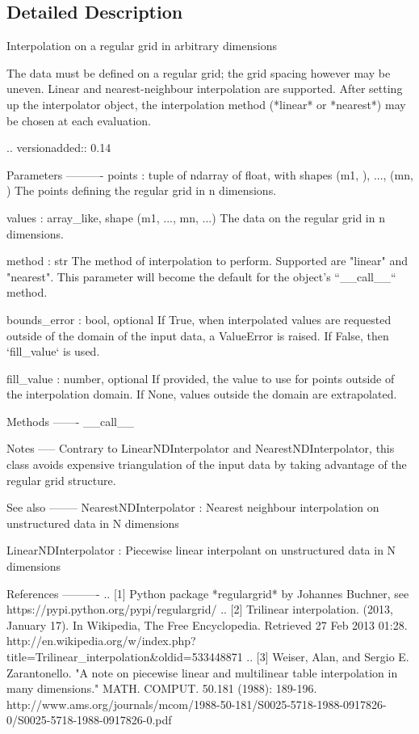 \subsection{Detailed Description}
\begin{DoxyVerb}Interpolation on a regular grid in arbitrary dimensions

The data must be defined on a regular grid; the grid spacing however may be
uneven.  Linear and nearest-neighbour interpolation are supported. After
setting up the interpolator object, the interpolation method (*linear* or
*nearest*) may be chosen at each evaluation.

.. versionadded:: 0.14

Parameters
----------
points : tuple of ndarray of float, with shapes (m1, ), ..., (mn, )
    The points defining the regular grid in n dimensions.

values : array_like, shape (m1, ..., mn, ...)
    The data on the regular grid in n dimensions.

method : str
    The method of interpolation to perform. Supported are "linear" and
    "nearest". This parameter will become the default for the object's
    ``__call__`` method.

bounds_error : bool, optional
    If True, when interpolated values are requested outside of the
    domain of the input data, a ValueError is raised.
    If False, then `fill_value` is used.

fill_value : number, optional
    If provided, the value to use for points outside of the
    interpolation domain. If None, values outside
    the domain are extrapolated.

Methods
-------
__call__

Notes
-----
Contrary to LinearNDInterpolator and NearestNDInterpolator, this class
avoids expensive triangulation of the input data by taking advantage of the
regular grid structure.

See also
--------
NearestNDInterpolator : Nearest neighbour interpolation on unstructured
                        data in N dimensions

LinearNDInterpolator : Piecewise linear interpolant on unstructured data
                       in N dimensions

References
----------
.. [1] Python package *regulargrid* by Johannes Buchner, see
       https://pypi.python.org/pypi/regulargrid/
.. [2] Trilinear interpolation. (2013, January 17). In Wikipedia, The Free
       Encyclopedia. Retrieved 27 Feb 2013 01:28.
       http://en.wikipedia.org/w/index.php?title=Trilinear_interpolation&oldid=533448871
.. [3] Weiser, Alan, and Sergio E. Zarantonello. "A note on piecewise linear
       and multilinear table interpolation in many dimensions." MATH.
       COMPUT. 50.181 (1988): 189-196.
       http://www.ams.org/journals/mcom/1988-50-181/S0025-5718-1988-0917826-0/S0025-5718-1988-0917826-0.pdf\end{DoxyVerb}
 


